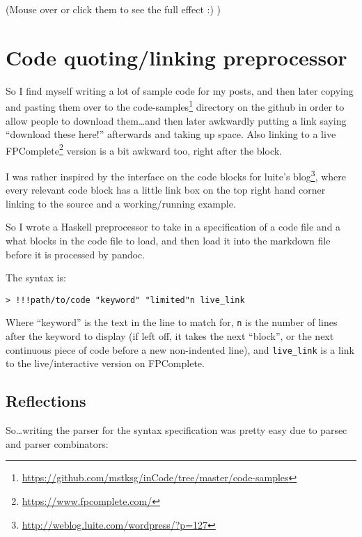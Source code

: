 \documentclass[]{article}
\renewcommand{\href}[2]{#2\footnote{\url{#1}}}
\begin{document}
(Mouse over or click them to see the full effect :) )

\section{Code quoting/linking
preprocessor}\label{code-quotinglinking-preprocessor}

So I find myself writing a lot of sample code for my posts, and then later
copying and pasting them over to the
\href{https://github.com/mstksg/inCode/tree/master/code-samples}{code-samples}
directory on the github in order to allow people to download them\ldots{}and
then later awkwardly putting a link saying ``download these here!'' afterwards
and taking up space. Also linking to a live
\href{https://www.fpcomplete.com/}{FPComplete} version is a bit awkward too,
right after the block.

I was rather inspired by the interface on the code blocks for
\href{http://weblog.luite.com/wordpress/?p=127}{luite's blog}, where every
relevant code block has a little link box on the top right hand corner linking
to the source and a working/running example.

So I wrote a Haskell preprocessor to take in a specification of a code file and
a what blocks in the code file to load, and then load it into the markdown file
before it is processed by pandoc.

The syntax is:

\begin{verbatim}
> !!!path/to/code "keyword" "limited"n live_link
\end{verbatim}

Where ``keyword'' is the text in the line to match for, \texttt{n} is the number
of lines after the keyword to display (if left off, it takes the next ``block'',
or the next continuous piece of code before a new non-indented line), and
\texttt{live\_link} is a link to the live/interactive version on FPComplete.

\subsection{Reflections}\label{reflections}

So\ldots{}writing the parser for the syntax specification was pretty easy due to
parsec and parser combinators:
\end{document}
